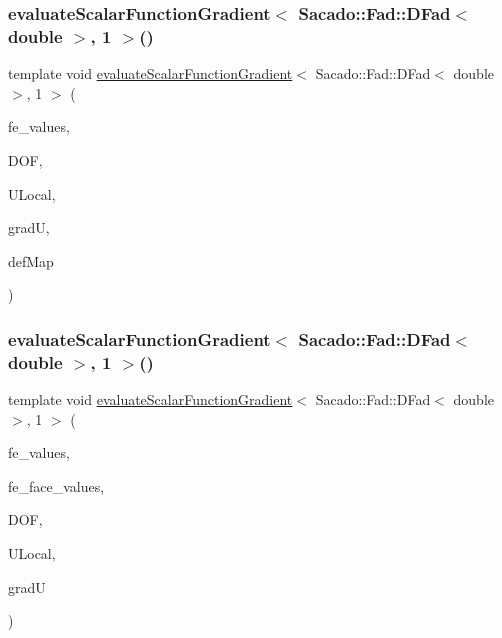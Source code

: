 \subsubsection{\texorpdfstring{evaluateScalarFunctionGradient$<$ Sacado::Fad::DFad$<$ double $>$, 1 $>$()}{evaluateScalarFunctionGradient< Sacado::Fad::DFad< double >, 1 >()}\hspace{0.1cm}{\footnotesize\ttfamily [2/4]}}
{\footnotesize\ttfamily template void \mbox{\hyperlink{group___evaluation_functions_gabedd4ae2841d2332ed0df0513b189e34}{evaluate\+Scalar\+Function\+Gradient}}$<$ Sacado\+::\+Fad\+::\+D\+Fad$<$ double $>$, 1 $>$ (\begin{DoxyParamCaption}\item[{const F\+E\+Values$<$ 1 $>$ \&}]{fe\+\_\+values,  }\item[{unsigned int}]{D\+OF,  }\item[{Table$<$ 1, Sacado\+::\+Fad\+::\+D\+Fad$<$ double $>$$>$ \&}]{U\+Local,  }\item[{Table$<$ 2, Sacado\+::\+Fad\+::\+D\+Fad$<$ double $>$$>$ \&}]{gradU,  }\item[{\mbox{\hyperlink{structdeformation_map}{deformation\+Map}}$<$ Sacado\+::\+Fad\+::\+D\+Fad$<$ double $>$, 1 $>$ \&}]{def\+Map }\end{DoxyParamCaption})}

\mbox{\label{function_evaluations_8cc_a4a0fd4f75bf25ccf08f6da45df20d5a7}} 
\subsubsection{\texorpdfstring{evaluateScalarFunctionGradient$<$ Sacado::Fad::DFad$<$ double $>$, 1 $>$()}{evaluateScalarFunctionGradient< Sacado::Fad::DFad< double >, 1 >()}\hspace{0.1cm}{\footnotesize\ttfamily [3/4]}}
{\footnotesize\ttfamily template void \mbox{\hyperlink{group___evaluation_functions_gabedd4ae2841d2332ed0df0513b189e34}{evaluate\+Scalar\+Function\+Gradient}}$<$ Sacado\+::\+Fad\+::\+D\+Fad$<$ double $>$, 1 $>$ (\begin{DoxyParamCaption}\item[{const F\+E\+Values$<$ 1 $>$ \&}]{fe\+\_\+values,  }\item[{const F\+E\+Face\+Values$<$ 1 $>$ \&}]{fe\+\_\+face\+\_\+values,  }\item[{unsigned int}]{D\+OF,  }\item[{Table$<$ 1, Sacado\+::\+Fad\+::\+D\+Fad$<$ double $>$$>$ \&}]{U\+Local,  }\item[{Table$<$ 2, Sacado\+::\+Fad\+::\+D\+Fad$<$ double $>$$>$ \&}]{gradU }\end{DoxyParamCaption})}

